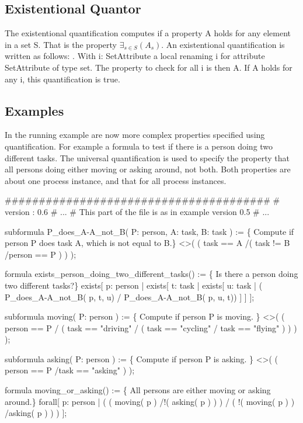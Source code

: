 \subsection{Existentional Quantor}
\label{language:exists}

The existentional quantification computes if a property A holds for any element
in a set S. That is the property $\exists_{s \in S}(A_s)$. An existentional
quantification is written as follows: . With i: SetAttribute a local renaming i for
attribute SetAttribute of type set. The property to check for all i is then A.
If A holds for any i, this quantification is true.

\subsection{Examples}

In the running example are now more complex properties specified using
quantification. For example a formula to test if there is a person doing two
different tasks. The universal quantification is used to specify the property
that all persons doing either moving or asking around, not both. Both
properties are about one process instance, and that for all process instances.

\begin{ltlcode}
#######################################
# version : 0.6
# ... 
# This part of the file is as in example version 0.5
# ...

subformula P_does_A-A_not_B( P: person, A: task, B: task ) := \{ 
 Compute if person P does task A, which is not equal to B.\}
  <>( ( task == A /\bs ( task != B /\bs person == P ) ) );

formula exists_person_doing_two_different_tasks() := \{
 Is there a person doing two different tasks?\}
  exists[ p: person   |
    exists[ t: task   |
      exists[ u: task |
        (  P_does_A-A_not_B( p, t, u) /\bs
           P_does_A-A_not_B( p, u, t)) 
      ]
    ]
  ];

subformula moving( P: person ) := \{
 Compute if person P is moving. \}
  <>( ( person == P /\bs
        (   task == "driving" \bs/ 
          ( task == "cycling" \bs/
            task == "flying"
          )
        )
    ) );

subformula asking( P: person ) := \{
 Compute if person P is asking. \}
  <>( ( person == P /\bs task == "asking" ) );

formula moving_or_asking() := \{
 All persons are either moving or asking around.\}
  forall[ p: person |
    ( 
      ( moving( p ) /\bs !( asking( p ) ) ) \bs/
      ( !( moving( p ) ) /\bs asking( p ) )
    )
  ];
\end{ltlcode}

